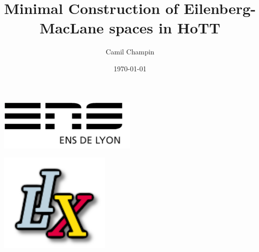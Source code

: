 \documentclass[a4paper]{report}
\title{Minimal Construction of Eilenberg-MacLane spaces in HoTT}
\author{Camil Champin}
\date{\today}
\begin{document}
\begin{titlepage}
  \begin{minipage}{0.5\textwidth}
    \begin{flushleft} \includegraphics[width=0.5\textwidth]{logo_ensl.png}
    \end{flushleft}
  \end{minipage}
  \begin{minipage}{0.5\textwidth}

    \begin{flushright} \includegraphics[width=0.4\textwidth]{logo_lix}
    \end{flushright}

  \end{minipage}\\[.5 cm]


\end{titlepage}
\end{document}
